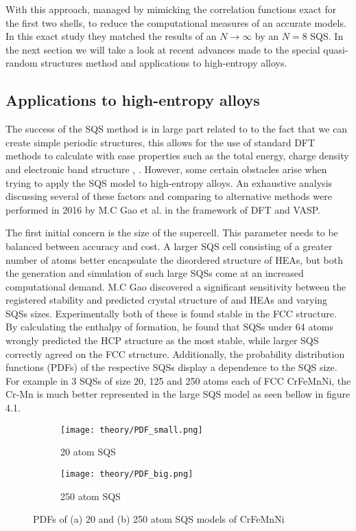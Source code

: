 With this approach, \cite{sqsfull} managed by mimicking the correlation functions exact for the first two shells, to reduce the computational measures of an accurate models. In this exact study they matched the results of an $N \rightarrow \infty$ by an $N=8$ SQS. In the next section we will take a look at recent advances made to the special quasi-random structures method and applications to high-entropy alloys. 

\subsection{Applications to high-entropy alloys}
The success of the SQS method is in large part related to to the fact that we can create simple periodic structures, this allows for the use of standard DFT methods to calculate with ease properties such as the total energy, charge density and electronic band structure \cite{sqs_dos}, \cite{sqs_bg}. However, some certain obstacles arise when trying to apply the SQS model to high-entropy alloys. An exhaustive analysis discussing several of these factors and comparing to alternative methods were performed in 2016 by M.C Gao et al. \cite{hea2016_ch10}  in the framework of DFT and VASP.

The first initial concern is the size of the supercell. This parameter  needs to be balanced between accuracy and cost. A larger SQS cell consisting of a greater number of atoms better encapsulate the disordered structure of HEAs, but both the generation and simulation of such large SQSs come at an increased computational demand.  M.C Gao discovered a significant sensitivity between the registered stability and predicted crystal structure of  and  HEAs and varying SQSs sizes. Experimentally both of these is found stable in the FCC structure. By calculating the enthalpy of formation, he found that SQSs under 64 atoms wrongly predicted the HCP structure as the most stable, while larger SQS correctly agreed on the FCC structure. Additionally, the probability distribution functions (PDFs) of the respective SQSs display a dependence to the SQS size. For example in 3 SQSs of size 20, 125 and 250 atoms each of FCC CrFeMnNi, the Cr-Mn is much better represented in the large SQS model as seen bellow in figure 4.1.

\begin{figure}[H]
\begin{subfigure}{.5\textwidth}
\texttt{[image: theory/PDF\_small.png]}
\caption{20 atom SQS}	
\end{subfigure}
\begin{subfigure}{.5\textwidth}
\texttt{[image: theory/PDF\_big.png]}
\caption{250 atom SQS}
\end{subfigure}
\caption{PDFs of (a) 20 and (b) 250 atom SQS models of CrFeMnNi \cite{hea2016_ch10}}
\end{figure}
     
